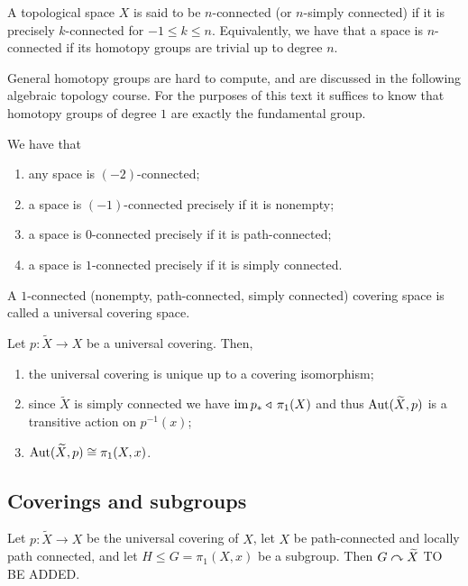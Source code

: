 \documentclass[11pt,a4paper]{article}
\begin{document}
\begin{definition}
  A topological space $X$ is said to be $n$-connected (or $n$-simply connected)
  if it is precisely $k$-connected for $-1 \le k \le n$.
  Equivalently, we have that a space is $n$-connected if its homotopy
  groups are trivial up to degree $n$.
\end{definition}
\begin{remark}
  General homotopy groups are hard to compute,
  and are discussed in the following algebraic topology course.
  For the purposes of this text it suffices to know that homotopy groups
  of degree $1$ are exactly the fundamental group.
\end{remark}

\begin{example}
  We have that
  \begin{enumerate}
    \item[(1)] any space is $(-2)$-connected;
    \item[(2)] a space is $(-1)$-connected precisely if it is nonempty;
    \item[(3)] a space is $0$-connected precisely if it is path-connected;
    \item[(4)] a space is $1$-connected precisely if it is simply connected. 
  \end{enumerate}
\end{example}

\begin{definition}
  A $1$-connected (nonempty, path-connected, simply connected)
  covering space is called a universal covering space.
\end{definition}

\begin{corollary}
  Let $p \colon \widetilde X \to X$ be a universal covering.
  Then,
  \begin{enumerate}
    \item[(1)] the universal covering is unique up to a covering isomorphism;
    \item[(2)] since $\widetilde X$ is simply connected we have
      $\operatorname{im} p_* \triangleleft\, \pi_1(X)$ and thus $\operatorname{Aut}(\widetilde X, p)$ is a
      transitive action on $p^{-1}(x)$;
    \item[(3)] $\operatorname{Aut}(\widetilde X, p) \cong \pi_1(X,x)$.
  \end{enumerate}
\end{corollary}

\subsection{Coverings and subgroups}
\begin{theorem}
  Let $p \colon \widetilde X \to X$ be the universal covering of $X$,
  let $X$ be path-connected and locally path connected,
  and let $H \leqslant G = \pi_1(X,x)$ be a subgroup.
  Then $G \curvearrowright \widetilde X$ TO BE ADDED.
\end{theorem}
\end{document}
